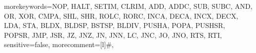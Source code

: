 \newcommand\MESourceFileWithResult[5][]{
	\setkeys{MEMacros}{language={[ANSI]C},options={},#1}%
	\begingroup%
	\begingroup\edef\x{\endgroup\noexpand\MESetListingFormat[\ME@options]{\ME@language}}\x
	\if@twocolumn%
	\setlength\mywidth{\columnwidth}
	\else%
	\setlength\mywidth{.46\textwidth}
	\ifx\eBook\undefined \lstset{basicstyle=\tiny} \fi
	\fi
	\ifx\MayFloat\undefined
	{\color{HeadingColor}\bfseries\scriptsize #4}
	\else
	{
		\begin{program*}[h!btp]	\caption{#4}\par\ifx\WEBBook\undefined\vskip-\baselineskip\else\fi
		}
		\vglue-1.7\baselineskip
		\fi\mbox{}\phantomsection
		\vskip-.6\baselineskip\noindent
		\begin{tabular}{p{.48\mywidth}p{.48\mywidth}}
		\noindent\begingroup\protected@edef\x{\endgroup\noexpand
			}
		\x
		\ME@decorations %
			&
			\lstset{language={bash},backgroundcolor=\color{gray!20}}				
			
				 {#3}\\
		\end{tabular}
		\par\vskip-.6\baselineskip
		\ifx\MayFloat\undefined	%
		\else
		{	
			\caption{#4}\label{#5}
		\end{program*}}
		\fi
		\endgroup%
	}
\makeatother

{morekeywords={NOP, HALT, SETIM, CLRIM, ADD, ADDC, SUB, SUBC, AND, OR, XOR, CMPA,
							SHL, SHR, ROLC, RORC, INCA, DECA, INCX, DECX, LDA, STA,
							BLDX, BLDSP, BSTSP, BLDIV, PUSHA, POPA, PUSHSR, POPSR, JMP, JSR,
							JZ, JNZ, JN, JNN, LC, JNC, JO, JNO, RTS, RTI},
sensitive=false,
morecomment=[l]{\#},
}

